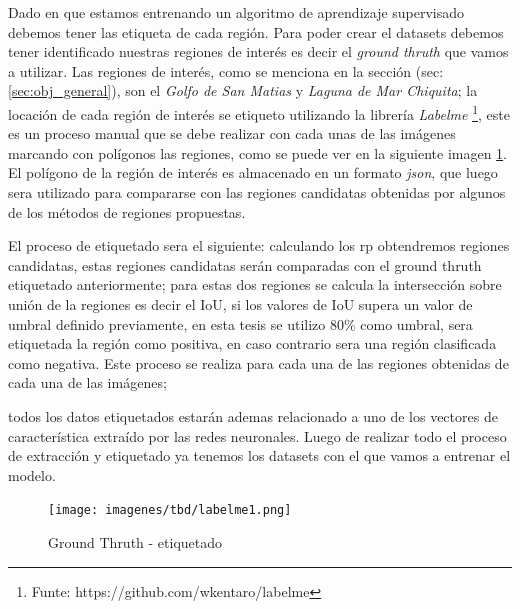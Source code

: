 Dado en que estamos entrenando un algoritmo de aprendizaje supervisado debemos tener las etiqueta de cada región. Para poder crear el datasets debemos tener identificado nuestras regiones de interés es decir el \textit{ground thruth} que vamos a utilizar. Las regiones de interés, como se menciona en la sección (sec:\ref{sec:obj_general}), son el \textit{Golfo de San Matias} y  \textit{Laguna de Mar Chiquita}; la locación de cada región de interés se etiqueto utilizando la librería \textit{Labelme} \footnote{Funte: https://github.com/wkentaro/labelme}, este es un proceso manual que se debe realizar con cada unas de las imágenes marcando con polígonos las regiones, como se puede ver en la siguiente imagen \ref{Fig:labelme-etiquetado}. El polígono de la región de interés es almacenado en un formato \textit{json}, que luego sera utilizado para compararse con las regiones candidatas obtenidas por algunos de los métodos de regiones propuestas. 

El proceso de etiquetado sera el siguiente: calculando los \ac{rp} obtendremos regiones candidatas, estas regiones candidatas serán comparadas con el ground thruth etiquetado anteriormente; para estas dos regiones se calcula la intersección sobre unión de la regiones es decir el IoU, si los valores de IoU supera un valor de umbral definido previamente, en esta tesis se utilizo $80\%$ como umbral, sera etiquetada la región como positiva, en caso contrario sera una región clasificada como negativa. Este proceso se realiza para cada una de las regiones obtenidas de cada una de las imágenes; 


todos los datos etiquetados estarán ademas relacionado a uno de los vectores de característica extraído por las redes neuronales. Luego de realizar todo el proceso de extracción y etiquetado ya tenemos los datasets con el que vamos a entrenar el modelo.



\begin{figure}[H] \centering
  \texttt{[image: imagenes/tbd/labelme1.png]}
  \caption{Ground Thruth - etiquetado}\label{Fig:labelme-etiquetado}
\end{figure}

